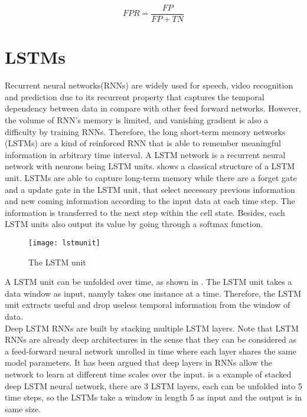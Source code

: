 \begin{equation} \label{eq:fpr}
FPR = \dfrac{FP}{FP+TN}
\end{equation}



\section{LSTMs}
\label{sec:LSTMs}

Recurrent neural networks(RNNs) are widely used for speech, video recognition and prediction due to its recurrent property that captures the temporal dependency between data in compare with other feed forward networks. However, the volume of RNN’s memory is limited, and vanishing gradient is also a difficulty by training RNNs. Therefore, the long short-term memory networks (LSTMs) are a kind of reinforced RNN that is able to remember meaningful information in arbitrary time interval. A LSTM network is a recurrent neural network with neurons being LSTM units.  shows a classical structure of a LSTM unit. LSTMs are able to capture long-term memory while there are a forget gate and a update gate in the LSTM unit, that select necessary previous information and new coming information according to the input data at each time step. The information is transferred to the next step within the cell state. Besides, each LSTM units also output its value by going through a softmax function.

\begin{figure}[ht]
\centering
\texttt{[image: lstmunit]}
\caption[LSTM unit]{The LSTM unit}
\label{fig:lstmunit}
\end{figure}


A LSTM unit can be unfolded over time, as shown in . The LSTM unit takes a data window as input, namyly takes one instance at a time. Therefore, the LSTM unit extracts useful and drop useless temporal information from the window of data.\\


Deep LSTM RNNs are built by stacking multiple LSTM layers. Note that LSTM RNNs are already deep architectures in the sense that they can be considered as a feed-forward neural network unrolled in time where each layer shares the same model parameters. It has been argued that deep layers in RNNs allow the network to learn at different time scales over the input\cite{deep}.  is a example of stacked deep LSTM neural network, there are 3 LSTM layers, each can be unfolded into 5 time steps, so the LSTMs take a window in length 5 as input and the output is in same size.

